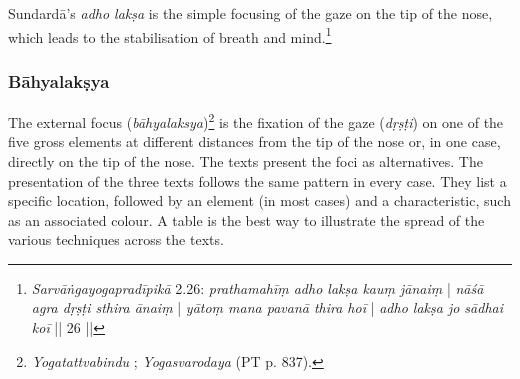 Sundardā's \textit{adho lakṣa} is the simple focusing of the gaze on the tip of the nose, which leads to the stabilisation of breath and mind.\footnote{\textit{Sarvāṅgayogapradīpikā} 2.26: \textit{prathamahīṃ adho lakṣa kauṃ jānaiṃ} | \textit{nāśā agra dṛṣṭi sthira ānaiṃ} | \textit{yātoṃ mana pavanā thira hoī} | \textit{adho lakṣa jo sādhai koī} || 26 ||}\\

\subsubsection{Bāhyalakṣya}
The external focus (\textit{bāhyalaksya})\footnote{\textit{Yogatattvabindu} ; \textit{Yogasvarodaya} (PT p. 837).} is the fixation of the gaze (\textit{dṛṣṭi}) on one of the five gross elements at different distances from the tip of the nose or, in one case, directly on the tip of the nose. The texts present the foci as alternatives. The presentation of the three texts follows the same pattern in every case. They list a specific location, followed by an element (in most cases) and a characteristic, such as an associated colour. A table is the best way to illustrate the spread of the various techniques across the texts.
\newpage 
